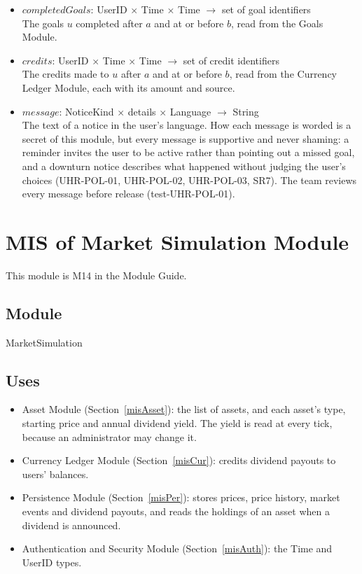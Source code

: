 \documentclass[12pt, titlepage]{article}
\begin{document}
\begin{itemize}
  True if $u$ has an active goal that is not yet met on local day $D$, read
  from the Goals Module.
\item $\mathit{completedGoals}$: UserID $\times$ Time $\times$ Time
  $\rightarrow$ set of goal identifiers\\
  The goals $u$ completed after $a$ and at or before $b$, read from the Goals
  Module.
\item $\mathit{credits}$: UserID $\times$ Time $\times$ Time $\rightarrow$
  set of credit identifiers\\
  The credits made to $u$ after $a$ and at or before $b$, read from the
  Currency Ledger Module, each with its amount and source.
\item $\mathit{message}$: NoticeKind $\times$ details $\times$ Language
  $\rightarrow$ String\\
  The text of a notice in the user's language. How each message is worded is
  a secret of this module, but every message is supportive and never shaming:
  a reminder invites the user to be active rather than pointing out a missed
  goal, and a downturn notice describes what happened without judging the
  user's choices (UHR-POL-01, UHR-POL-02, UHR-POL-03, SR7). The team reviews
  every message before release (test-UHR-POL-01).
\end{itemize}

\section{MIS of Market Simulation Module} \label{misMkt}

This module is M14 in the Module Guide.

\subsection{Module}

MarketSimulation

\subsection{Uses}

\begin{itemize}
\item Asset Module (Section~\ref{misAsset}): the list of assets, and each
  asset's type, starting price and annual dividend yield. The yield is read
  at every tick, because an administrator may change it.
\item Currency Ledger Module (Section~\ref{misCur}): credits dividend payouts
  to users' balances.
\item Persistence Module (Section~\ref{misPer}): stores prices, price
  history, market events and dividend payouts, and reads the holdings of an
  asset when a dividend is announced.
\item Authentication and Security Module (Section~\ref{misAuth}): the Time
  and UserID types.
\end{itemize}
\end{document}
